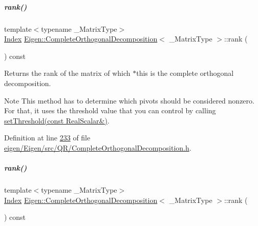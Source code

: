 \mbox{\label{group___q_r___module_af348f64b26f8467a020062c22b748806}} 
\subparagraph{\texorpdfstring{rank()}{rank()}\hspace{0.1cm}{\footnotesize\ttfamily [1/2]}}
{\footnotesize\ttfamily template$<$typename \+\_\+\+Matrix\+Type$>$ \\
\hyperlink{namespace_eigen_a62e77e0933482dafde8fe197d9a2cfde}{Index} \hyperlink{group___q_r___module_class_eigen_1_1_complete_orthogonal_decomposition}{Eigen\+::\+Complete\+Orthogonal\+Decomposition}$<$ \+\_\+\+Matrix\+Type $>$\+::rank (\begin{DoxyParamCaption}{ }\end{DoxyParamCaption}) const\hspace{0.3cm}{\ttfamily [inline]}}

\begin{DoxyReturn}{Returns}
the rank of the matrix of which $\ast$this is the complete orthogonal decomposition.
\end{DoxyReturn}
\begin{DoxyNote}{Note}
This method has to determine which pivots should be considered nonzero. For that, it uses the threshold value that you can control by calling \hyperlink{group___q_r___module_aa9c9f7cbde9d58ca5552381b70ad8d82}{set\+Threshold(const Real\+Scalar\&)}. 
\end{DoxyNote}


Definition at line \hyperlink{eigen_2_eigen_2src_2_q_r_2_complete_orthogonal_decomposition_8h_source_l00233}{233} of file \hyperlink{eigen_2_eigen_2src_2_q_r_2_complete_orthogonal_decomposition_8h_source}{eigen/\+Eigen/src/\+Q\+R/\+Complete\+Orthogonal\+Decomposition.\+h}.

\mbox{\label{group___q_r___module_af348f64b26f8467a020062c22b748806}} 
\subparagraph{\texorpdfstring{rank()}{rank()}\hspace{0.1cm}{\footnotesize\ttfamily [2/2]}}
{\footnotesize\ttfamily template$<$typename \+\_\+\+Matrix\+Type$>$ \\
\hyperlink{namespace_eigen_a62e77e0933482dafde8fe197d9a2cfde}{Index} \hyperlink{group___q_r___module_class_eigen_1_1_complete_orthogonal_decomposition}{Eigen\+::\+Complete\+Orthogonal\+Decomposition}$<$ \+\_\+\+Matrix\+Type $>$\+::rank (\begin{DoxyParamCaption}{ }\end{DoxyParamCaption}) const\hspace{0.3cm}{\ttfamily [inline]}}

